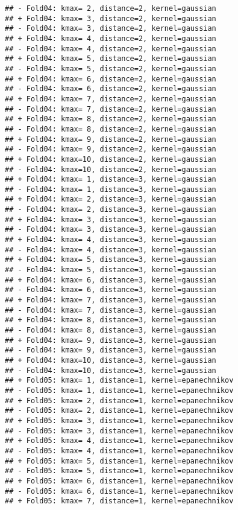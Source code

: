 \documentclass[
]{article}
\begin{document}
\begin{verbatim}
## - Fold04: kmax= 2, distance=2, kernel=gaussian 
## + Fold04: kmax= 3, distance=2, kernel=gaussian 
## - Fold04: kmax= 3, distance=2, kernel=gaussian 
## + Fold04: kmax= 4, distance=2, kernel=gaussian 
## - Fold04: kmax= 4, distance=2, kernel=gaussian 
## + Fold04: kmax= 5, distance=2, kernel=gaussian 
## - Fold04: kmax= 5, distance=2, kernel=gaussian 
## + Fold04: kmax= 6, distance=2, kernel=gaussian 
## - Fold04: kmax= 6, distance=2, kernel=gaussian 
## + Fold04: kmax= 7, distance=2, kernel=gaussian 
## - Fold04: kmax= 7, distance=2, kernel=gaussian 
## + Fold04: kmax= 8, distance=2, kernel=gaussian 
## - Fold04: kmax= 8, distance=2, kernel=gaussian 
## + Fold04: kmax= 9, distance=2, kernel=gaussian 
## - Fold04: kmax= 9, distance=2, kernel=gaussian 
## + Fold04: kmax=10, distance=2, kernel=gaussian 
## - Fold04: kmax=10, distance=2, kernel=gaussian 
## + Fold04: kmax= 1, distance=3, kernel=gaussian 
## - Fold04: kmax= 1, distance=3, kernel=gaussian 
## + Fold04: kmax= 2, distance=3, kernel=gaussian 
## - Fold04: kmax= 2, distance=3, kernel=gaussian 
## + Fold04: kmax= 3, distance=3, kernel=gaussian 
## - Fold04: kmax= 3, distance=3, kernel=gaussian 
## + Fold04: kmax= 4, distance=3, kernel=gaussian 
## - Fold04: kmax= 4, distance=3, kernel=gaussian 
## + Fold04: kmax= 5, distance=3, kernel=gaussian 
## - Fold04: kmax= 5, distance=3, kernel=gaussian 
## + Fold04: kmax= 6, distance=3, kernel=gaussian 
## - Fold04: kmax= 6, distance=3, kernel=gaussian 
## + Fold04: kmax= 7, distance=3, kernel=gaussian 
## - Fold04: kmax= 7, distance=3, kernel=gaussian 
## + Fold04: kmax= 8, distance=3, kernel=gaussian 
## - Fold04: kmax= 8, distance=3, kernel=gaussian 
## + Fold04: kmax= 9, distance=3, kernel=gaussian 
## - Fold04: kmax= 9, distance=3, kernel=gaussian 
## + Fold04: kmax=10, distance=3, kernel=gaussian 
## - Fold04: kmax=10, distance=3, kernel=gaussian 
## + Fold05: kmax= 1, distance=1, kernel=epanechnikov 
## - Fold05: kmax= 1, distance=1, kernel=epanechnikov 
## + Fold05: kmax= 2, distance=1, kernel=epanechnikov 
## - Fold05: kmax= 2, distance=1, kernel=epanechnikov 
## + Fold05: kmax= 3, distance=1, kernel=epanechnikov 
## - Fold05: kmax= 3, distance=1, kernel=epanechnikov 
## + Fold05: kmax= 4, distance=1, kernel=epanechnikov 
## - Fold05: kmax= 4, distance=1, kernel=epanechnikov 
## + Fold05: kmax= 5, distance=1, kernel=epanechnikov 
## - Fold05: kmax= 5, distance=1, kernel=epanechnikov 
## + Fold05: kmax= 6, distance=1, kernel=epanechnikov 
## - Fold05: kmax= 6, distance=1, kernel=epanechnikov 
## + Fold05: kmax= 7, distance=1, kernel=epanechnikov 

\end{verbatim}
\end{document}
